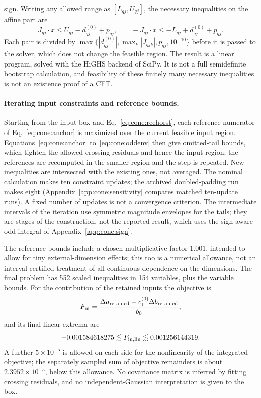\documentclass[11pt,a4paper]{article}
\numberwithin{equation}{section}
\newcommand{\sci}[2]{#1\times10^{#2}}
\begin{document}
sign. Writing any allowed range as $[L_{qj},U_{qj}]$, the necessary inequalities on the affine part are
\begin{equation}
 J_{qj}\cdot x\le U_{qj}-d^{(0)}_{qj}+p_{qj},\qquad -J_{qj}\cdot x\le-L_{qj}+d^{(0)}_{qj}+p_{qj}.
 \label{eq:cone:lp}
\end{equation}
Each pair is divided by $\max\{|d^{(0)}_{qj}|,\max_k|J_{qjk}|,p_{qj},10^{-10}\}$ before it is passed to the solver,
which does not change the feasible region. The result is a linear program, solved with the HiGHS backend of SciPy. It is
not a full semidefinite bootstrap calculation, and feasibility of these finitely many necessary inequalities is not an
existence proof of a CFT.

\paragraph{Iterating input constraints and reference bounds.} Starting from the input box and
Eq.~\eqref{eq:cone:reehorst}, each reference numerator of Eq.~\eqref{eq:cone:anchor} is maximized over the current
feasible input region. Equations~\eqref{eq:cone:anchor} to~\eqref{eq:cone:oddenv} then give omitted-tail bounds, which
tighten the allowed crossing residuals and hence the input region; the references are recomputed in the smaller region
and the step is repeated. New inequalities are intersected with the existing ones, not averaged. The nominal calculation
makes ten constraint updates; the archived doubled-padding run makes eight (Appendix~\ref{app:cone:sensitivity} compares
matched ten-update runs). A fixed number of updates is not a convergence criterion. The intermediate intervals of the
iteration use symmetric magnitude envelopes for the tails; they are stages of the construction, not the reported result,
which uses the sign-aware odd integral of Appendix~\ref{app:cone:sign}.

The reference bounds include a chosen multiplicative factor $1.001$, intended to allow for tiny external-dimension
effects; this too is a numerical allowance, not an interval-certified treatment of all continuous dependence on the
dimensions. The final problem has 552 scaled inequalities in 154 variables, plus the variable bounds. For the
contribution of the retained inputs the objective is
\begin{equation}
 F_{\rm in}=\frac{\Delta a_{\rm retained}-c_1^{(0)}\Delta b_{\rm retained}}{b_0},
\end{equation}
and its final linear extrema are
\begin{equation}
 -0.001584618275\lesssim F_{\rm in,lin}\lesssim0.001256144319 .
 \label{eq:cone:inputlp}
\end{equation}
A further $\sci{5}{-5}$ is allowed on each side for the nonlinearity of the integrated objective; the separately
sampled sum of objective remainders is about $\sci{2.3952}{-5}$, below this allowance. No covariance matrix is
inferred by fitting crossing residuals, and no independent-Gaussian interpretation is given to the box.
\end{document}
